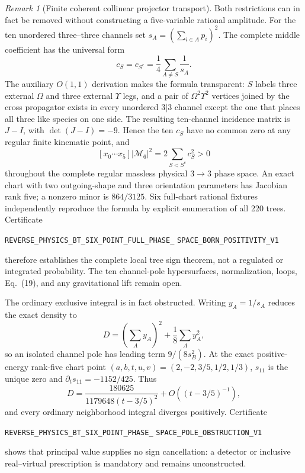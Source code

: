 \documentclass[11pt]{article}
\theoremstyle{definition}
\theoremstyle{remark}
\newtheorem{remark}[theorem]{Remark}
\begin{document}
\begin{remark}[Finite coherent collinear projector transport]
Both restrictions can in fact be removed without constructing a five-variable
rational amplitude.  For the ten unordered three--three channels set
$s_A=(\sum_{i\in A}p_i)^2$.  The complete middle coefficient has the universal
form
\[
 c_S=c_{S^c}=\frac14\sum_{A\ne S}\frac1{s_A}.
\]
The auxiliary $O(1,1)$ derivation makes the formula transparent: $S$ labels
three external $\Omega$ and three external $\Upsilon$ legs, and a pair of
$\Omega^2\Upsilon^2$ vertices joined by the cross propagator exists in every
unordered $3|3$ channel except the one that places all three like species on
one side.  The resulting ten-channel incidence matrix is $J-I$, with
$\det(J-I)=-9$.  Hence the ten $c_S$ have no common zero at any regular finite
kinematic point, and
\[
 [x_0\cdots x_5]|\mathcal M_6|^2=2\sum_{S<S^c}c_S^2>0
\]
throughout the complete regular massless physical $3\to3$ phase space.  An
exact chart with two outgoing-shape and three orientation parameters has
Jacobian rank five; a nonzero minor is $864/3125$.  Six full-chart rational
fixtures independently reproduce the formula by explicit enumeration of all
220 trees.  Certificate
\par\noindent
\texttt{REVERSE\_PHYSICS\_BT\_SIX\_POINT\_FULL\_PHASE\_}
\allowbreak\texttt{SPACE\_BORN\_POSITIVITY\_V1}
\par\noindent
therefore establishes the complete local tree sign theorem, not a regulated
or integrated probability.  The ten channel-pole hypersurfaces, normalization,
loops, Eq.~(19), and any gravitational lift remain open.

The ordinary exclusive integral is in fact obstructed.  Writing $y_A=1/s_A$
reduces the exact density to
\[
 D=\left(\sum_Ay_A\right)^2+\frac18\sum_Ay_A^2,
\]
so an isolated channel pole has leading term $9/(8s_B^2)$.  At the exact
positive-energy rank-five chart point
$(a,b,t,u,v)=(2,-2,3/5,1/2,1/3)$, $s_{11}$ is the unique zero and
$\partial_ts_{11}=-1152/425$.  Thus
\[
 D=\frac{180625}{1179648(t-3/5)^2}+O((t-3/5)^{-1}),
\]
and every ordinary neighborhood integral diverges positively.  Certificate
\par\noindent
\texttt{REVERSE\_PHYSICS\_BT\_SIX\_POINT\_PHASE\_}
\allowbreak\texttt{SPACE\_POLE\_OBSTRUCTION\_V1}
\par\noindent
shows that principal value supplies no sign cancellation: a detector or
inclusive real--virtual prescription is mandatory and remains unconstructed.


\end{remark}
\end{document}
